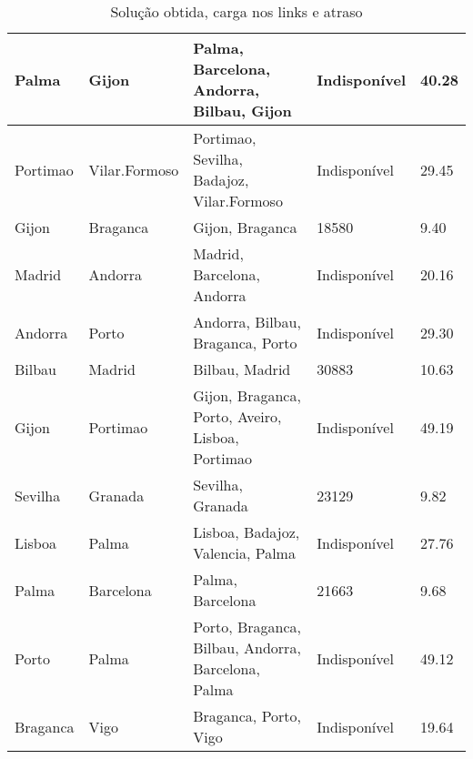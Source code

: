 \begin{table}[!htb]
{\begin{tabular}{|l|l|l|l|l|}
Palma & Gijon & Palma, Barcelona, Andorra, Bilbau, Gijon & Indisponível & 40.28 \\ \hline
Portimao & Vilar.Formoso & Portimao, Sevilha, Badajoz, Vilar.Formoso & Indisponível & 29.45 \\ \hline
Gijon & Braganca & Gijon, Braganca & 18580 & 9.40 \\ \hline
Madrid & Andorra & Madrid, Barcelona, Andorra & Indisponível & 20.16 \\ \hline
Andorra & Porto & Andorra, Bilbau, Braganca, Porto & Indisponível & 29.30 \\ \hline
Bilbau & Madrid & Bilbau, Madrid & 30883 & 10.63 \\ \hline
Gijon & Portimao & Gijon, Braganca, Porto, Aveiro, Lisboa, Portimao & Indisponível & 49.19 \\ \hline
Sevilha & Granada & Sevilha, Granada & 23129 & 9.82 \\ \hline
Lisboa & Palma & Lisboa, Badajoz, Valencia, Palma & Indisponível & 27.76 \\ \hline
Palma & Barcelona & Palma, Barcelona & 21663 & 9.68 \\ \hline
Porto & Palma & Porto, Braganca, Bilbau, Andorra, Barcelona, Palma & Indisponível & 49.12 \\ \hline
Braganca & Vigo & Braganca, Porto, Vigo & Indisponível & 19.64 \\ \hline
\end{tabular}}
\caption[]{Solução obtida, carga nos links e atraso}
\end{table}

